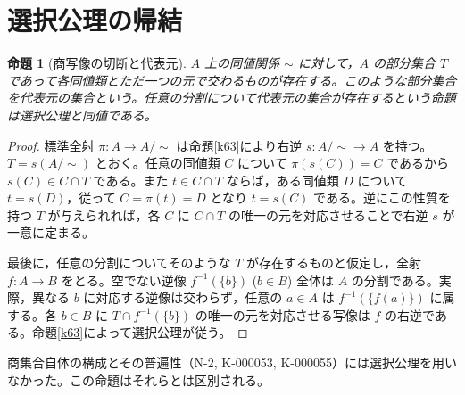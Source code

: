 \documentclass[a5paper,10pt,dvipdfmx]{jsarticle}
\theoremstyle{definition}
\theoremstyle{plain}
\newtheorem{prop}[ruledef]{命題}
\begin{document}
\section{選択公理の帰結}
\begin{prop}[商写像の切断と代表元]\label{k66}
$A$ 上の同値関係 $\sim$ に対して，$A$ の部分集合 $T$ であって各同値類とただ一つの元で交わるものが存在する。このような部分集合を代表元の集合という。任意の分割について代表元の集合が存在するという命題は選択公理と同値である。
\end{prop}
\begin{proof}
標準全射 $\pi:A\to A/{\sim}$ は命題\ref{k63}により右逆 $s:A/{\sim}\to A$ を持つ。$T=s(A/{\sim})$ とおく。任意の同値類 $C$ について $\pi(s(C))=C$ であるから $s(C)\in C\cap T$ である。また $t\in C\cap T$ ならば，ある同値類 $D$ について $t=s(D)$，従って $C=\pi(t)=D$ となり $t=s(C)$ である。逆にこの性質を持つ $T$ が与えられれば，各 $C$ に $C\cap T$ の唯一の元を対応させることで右逆 $s$ が一意に定まる。

最後に，任意の分割についてそのような $T$ が存在するものと仮定し，全射 $f:A\to B$ をとる。空でない逆像 $f^{-1}(\{b\})$ ($b\in B$) 全体は $A$ の分割である。実際，異なる $b$ に対応する逆像は交わらず，任意の $a\in A$ は $f^{-1}(\{f(a)\})$ に属する。各 $b\in B$ に $T\cap f^{-1}(\{b\})$ の唯一の元を対応させる写像は $f$ の右逆である。命題\ref{k63}によって選択公理が従う。
\end{proof}
商集合自体の構成とその普遍性（N-2, K-000053, K-000055）には選択公理を用いなかった。この命題はそれらとは区別される。
\end{document}

